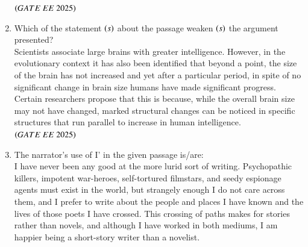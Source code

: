 \documentclass[journal,12pt,onecolumn]{IEEEtran}
\theoremstyle{remark}
\begin{document}
\begin{enumerate}
\hfill $\brak{GATE\ EE\ 2025}$
    \begin{enumerate}
      \end{enumerate}

  \item Which of the statement $\left(s\right)$ about the passage weaken $\left(s\right)$ the argument presented? \\
Scientists associate large brains with greater intelligence. However, in the evolutionary context it has also been identified that beyond a point, the size of the brain has not increased and yet after a particular period, in spite of no significant change in brain size humans have made significant progress. Certain researchers propose that this is because, while the overall brain size may not have changed, marked structural changes can be noticed in specific structures that run parallel to increase in human intelligence.     
\hfill $\brak{GATE\ EE\ 2025}$
    \begin{enumerate}
      \end{enumerate}

  \item The narrator's use of I' in the given passage is/are: \\   
 I have never been any good at the more lurid sort of writing. Psychopathic killers, impotent war-heroes, self-tortured filmstars, and seedy espionage agents must exist in the world, but strangely enough I do not care across them, and I prefer to write about the people and places I have known and the lives of those poets I have crossed. This crossing of paths makes for stories rather than novels, and although I have worked in both mediums, I am happier being a short-story writer than a novelist. 


\end{enumerate}
\end{document}
